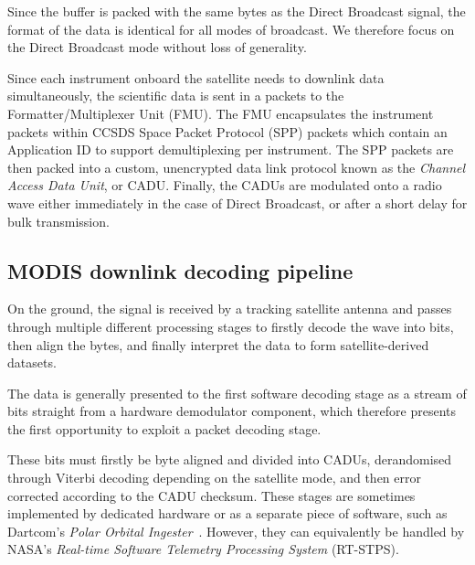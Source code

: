 Since the buffer is packed with the same bytes as the Direct Broadcast signal, the format of the data is identical for all modes of broadcast.
We therefore focus on the Direct Broadcast mode without loss of generality.


Since each instrument onboard the satellite needs to downlink data simultaneously, the scientific data is sent in a packets to the Formatter/Multiplexer Unit (FMU).
The FMU encapsulates the instrument packets within CCSDS Space Packet Protocol (SPP) packets which contain an Application ID to support demultiplexing per instrument.
The SPP packets are then packed into a custom, unencrypted data link protocol known as the \textit{Channel Access Data Unit}, or CADU.
Finally, the CADUs are modulated onto a radio wave either immediately in the case of Direct Broadcast, or after a short delay for bulk transmission.

\subsection{MODIS downlink decoding pipeline}

On the ground, the signal is received by a tracking satellite antenna and passes through multiple different processing stages to firstly decode the wave into bits, then align the bytes, and finally interpret the data to form satellite-derived datasets.

The data is generally presented to the first software decoding stage as a stream of bits straight from a hardware demodulator component, which therefore presents the first opportunity to exploit a packet decoding stage.

These bits must firstly be byte aligned and divided into CADUs, derandomised through Viterbi decoding depending on the satellite mode, and then error corrected according to the CADU checksum.
These stages are sometimes implemented by dedicated hardware or as a separate piece of software, such as Dartcom's \textit{Polar Orbital Ingester}~\cite{dartcomsystemsltdXBand2021,dartcomPOI}.
However, they can equivalently be handled by NASA's \textit{Real-time Software Telemetry Processing System} (RT-STPS).

